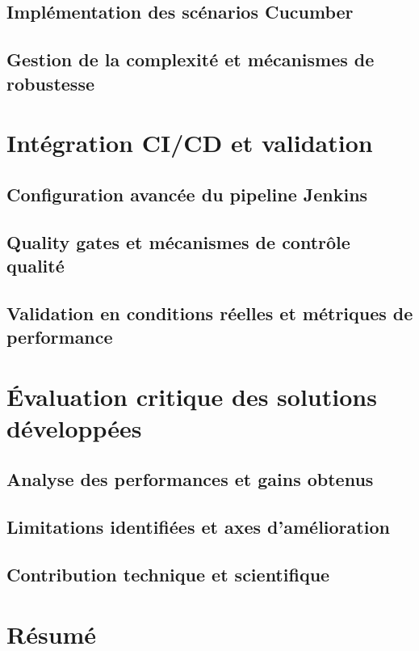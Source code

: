 \subsection{Implémentation des scénarios Cucumber}
\subsection{Gestion de la complexité et mécanismes de robustesse}

\section{Intégration CI/CD et validation}
\subsection{Configuration avancée du pipeline Jenkins}
\subsection{Quality gates et mécanismes de contrôle qualité}
\subsection{Validation en conditions réelles et métriques de performance}

\section{Évaluation critique des solutions développées}
\subsection{Analyse des performances et gains obtenus}
\subsection{Limitations identifiées et axes d'amélioration}
\subsection{Contribution technique et scientifique}

\section{Résumé}